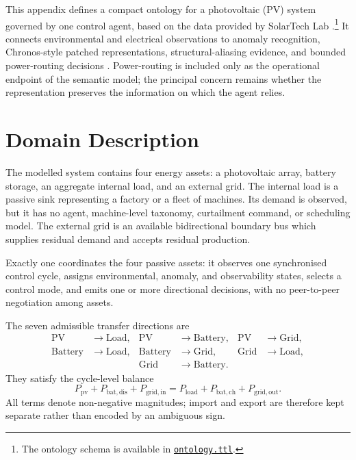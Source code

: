 This appendix defines a compact ontology for a photovoltaic (PV) system governed by one control agent, based on the data provided by SolarTech Lab \autocite{levaPhotovoltaicPowerWeather2020}.\footnote{The ontology schema is available in \href{https://github.com/FedericoSabbadini/patchAliasing/blob/main/coursework/deliverable3/ontology.ttl}{\texttt{ontology.ttl}}.} It connects environmental and electrical observations to anomaly recognition, Chronos-style patched representations, structural-aliasing evidence, and bounded power-routing decisions \autocite{ansariChronosLearningLanguage2024}. Power-routing is included only as the operational endpoint of the semantic model; the principal concern remains whether the representation preserves the information on which the agent relies.

\section{Domain Description}

The modelled system contains four energy assets: a photovoltaic array, battery storage, an aggregate internal load, and an external grid. The internal load is a passive sink representing a factory or a fleet of machines. Its demand is observed, but it has no agent, machine-level taxonomy, curtailment command, or scheduling model. The external grid is an available bidirectional boundary bus which supplies residual demand and accepts residual production.

Exactly one  coordinates the four passive assets: it observes one synchronised control cycle, assigns environmental, anomaly, and observability states, selects a control mode, and emits one or more directional decisions, with no peer-to-peer negotiation among assets.

The seven admissible transfer directions are
\begin{equation}
\label{eq:routes}
\begin{aligned}
\mathrm{PV}&\rightarrow\mathrm{Load}, &
\mathrm{PV}&\rightarrow\mathrm{Battery}, &
\mathrm{PV}&\rightarrow\mathrm{Grid},\\
\mathrm{Battery}&\rightarrow\mathrm{Load}, &
\mathrm{Battery}&\rightarrow\mathrm{Grid}, &
\mathrm{Grid}&\rightarrow\mathrm{Load},\\
&&\mathrm{Grid}&\rightarrow\mathrm{Battery}.&&
\end{aligned}
\end{equation}
They satisfy the cycle-level balance
\begin{equation}
\label{eq:power-balance}
P_{\mathrm{pv}}+P_{\mathrm{bat,dis}}+P_{\mathrm{grid,in}}
=P_{\mathrm{load}}+P_{\mathrm{bat,ch}}+P_{\mathrm{grid,out}}.
\end{equation}
All terms denote non-negative magnitudes; import and export are therefore kept separate rather than encoded by an ambiguous sign.

